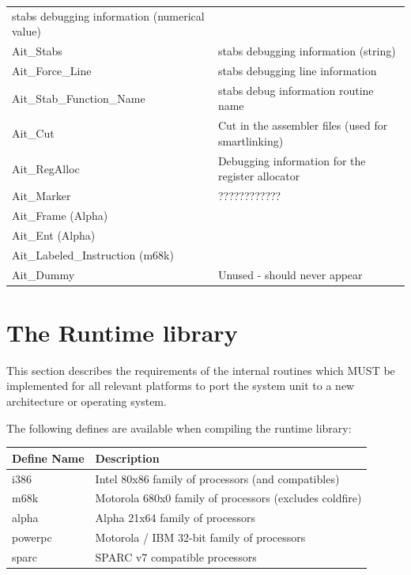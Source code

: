 \documentclass [a4paper,12pt]{article}
\begin{document}
\begin{longtable}{|l|p{10cm}|}
    stabs debugging information (numerical value) \\
Ait{\_}Stabs &
    stabs debugging information (string) \\
Ait{\_}Force{\_}Line&
    stabs debugging line information \\
Ait{\_}Stab{\_}Function{\_}Name&
    stabs debug information routine name \\
Ait{\_}Cut&
    Cut in the assembler files (used for smartlinking) \\
Ait{\_}RegAlloc&
    Debugging information for the register allocator \\
Ait{\_}Marker  & ???????????? \\
Ait{\_}Frame (Alpha)&  \\
Ait{\_}Ent (Alpha)&  \\
Ait{\_}Labeled{\_}Instruction (m68k)&  \\
Ait{\_}Dummy & Unused - should never appear
\end{longtable}

\section{The Runtime library}
\label{sec:mylabel9}

This section describes the requirements of the internal routines which MUST
be implemented for all relevant platforms to port the system unit to a new
architecture or operating system.

The following defines are available when compiling the runtime library:

\begin{longtable}{|l|p{10cm}|}
\hline
Define Name & Description \\
\hline
\endhead
\hline
\endfoot
i386        & Intel 80x86 family of processors (and compatibles) \\
m68k        & Motorola 680x0 family of processors (excludes coldfire) \\
alpha       & Alpha 21x64 family of processors \\
powerpc     & Motorola / IBM 32-bit family of processors \\
sparc       & SPARC v7 compatible processors
\end{longtable}
\end{document}
